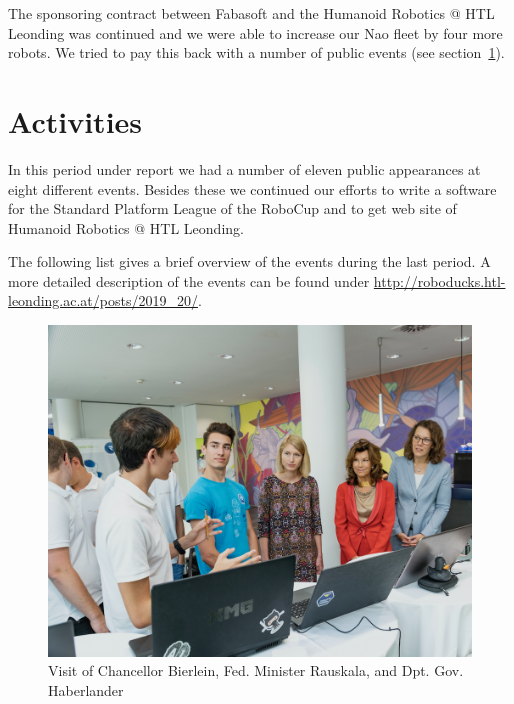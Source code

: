 \documentclass[11pt]{article}
\begin{document}
The sponsoring contract between Fabasoft and the Humanoid Robotics @ HTL Leonding was continued and we were able to increase our Nao fleet by four more robots. We tried to pay this back with a number of public events (see section~\ref{sec:activities_overview}).

\section{Activities}\label{sec:activities_overview}
In this period under report we had a number of eleven public appearances at eight different events. Besides these we continued our efforts to write a software for the Standard Platform League of the RoboCup and to get web site of Humanoid Robotics @ HTL Leonding.

The following list gives a brief overview of the events during the last period. A more detailed description of the events can be found under \url{http://roboducks.htl-leonding.ac.at/posts/2019_20/}.

\begin{figure}
\begin{center}
\includegraphics[scale=0.25]{img/activityImage1.png}
\end{center}
\caption{Visit of Chancellor Bierlein, Fed. Minister Rauskala, and Dpt. Gov. Haberlander}
\label{fig:ballDerLeondinger}
\end{figure}
\end{document}
